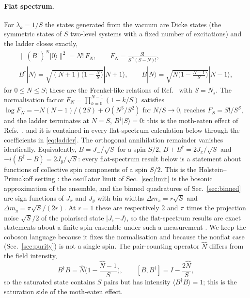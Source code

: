 \documentclass[11pt,a4paper]{article}
\newcommand{\ket}[1]{|#1\rangle}
\begin{document}
\paragraph{Flat spectrum.}
For $\lambda_k=1/S$ the states generated from the vacuum are Dicke states (the symmetric states of $S$ two-level systems with a fixed number of excitations) and the ladder closes exactly,
\begin{equation}
\begin{gathered}
\|(B^\dagger)^N\ket{0}\|^2=N!\,F_N,\qquad F_N=\frac{S!}{S^N(S-N)!},\\
B^\dagger\ket{N}=\sqrt{(N+1)\Big(1-\tfrac{N}{S}\Big)}\ket{N+1},\qquad
B\ket{N}=\sqrt{N\Big(1-\tfrac{N-1}{S}\Big)}\ket{N-1},
\end{gathered}
\label{eq:ladder}
\end{equation}
for $0\le N\le S$; these are the Frenkel-like relations of Ref.~\cite{Shiau2017} with $S=N_s$. The normalisation factor $F_N=\prod_{k=0}^{N-1}(1-k/S)$ satisfies $\log F_N=-N(N-1)/(2S)+O(N^3/S^2)$ for $N/S\to0$, reaches $F_S=S!/S^S$, and the ladder terminates at $N=S$, $B^\dagger\ket S=0$: this is the moth-eaten effect of Refs.~\cite{Pogosov2010,Shiau2017}, and it is contained in every flat-spectrum calculation below through the coefficients in \eqref{eq:ladder}. The orthogonal annihilation remainder vanishes identically. Equivalently, $B=J_-/\sqrt{S}$ for a spin $S/2$, $B+B^\dagger=2J_x/\sqrt{S}$ and $-i(B^\dagger-B)=2J_y/\sqrt{S}$: every flat-spectrum result below is a statement about functions of collective spin components of a spin $S/2$. This is the Holstein--Primakoff setting \cite{HolsteinPrimakoff1940}: the oscillator limit of Sec.~\ref{sec:limit} is the bosonic approximation of the ensemble, and the binned quadratures of Sec.~\ref{sec:binned} are sign functions of $J_x$ and $J_y$ with bin widths $\Delta m_x=r\sqrt S$ and $\Delta m_y=\pi\sqrt S/(2r)$. At $r=1$ these are respectively $2$ and $\pi$ times the projection noise $\sqrt S/2$ of the polarised state $\ket{J,-J}$, so the flat-spectrum results are exact statements about a finite spin ensemble under such a measurement \cite{Ma2011}. We keep the coboson language because it fixes the normalisation and because the nonflat case (Sec.~\ref{sec:purity}) is not a single spin. The pair-counting operator $\hat N$ differs from the field intensity,
\begin{equation}
B^\dagger B=\hat N\Big(1-\frac{\hat N-1}{S}\Big),\qquad [B,B^\dagger]=I-\frac{2\hat N}{S},
\label{eq:intensity}
\end{equation}
so the saturated state contains $S$ pairs but has intensity $\langle B^\dagger B\rangle=1$; this is the saturation side of the moth-eaten effect.
\end{document}
